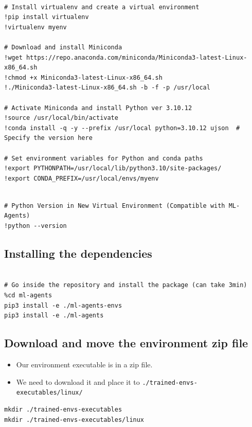 \documentclass[11pt,a4paper]{article}
\begin{document}
\begin{lstlisting}

# Install virtualenv and create a virtual environment
!pip install virtualenv
!virtualenv myenv

# Download and install Miniconda
!wget https://repo.anaconda.com/miniconda/Miniconda3-latest-Linux-x86_64.sh
!chmod +x Miniconda3-latest-Linux-x86_64.sh
!./Miniconda3-latest-Linux-x86_64.sh -b -f -p /usr/local

# Activate Miniconda and install Python ver 3.10.12
!source /usr/local/bin/activate
!conda install -q -y --prefix /usr/local python=3.10.12 ujson  # Specify the version here

# Set environment variables for Python and conda paths
!export PYTHONPATH=/usr/local/lib/python3.10/site-packages/
!export CONDA_PREFIX=/usr/local/envs/myenv
\end{lstlisting}

\begin{lstlisting}

# Python Version in New Virtual Environment (Compatible with ML-Agents)
!python --version
\end{lstlisting}

\subsection{Installing the dependencies}\label{installing-the-dependencies}

\begin{lstlisting}

# Go inside the repository and install the package (can take 3min)
%cd ml-agents
pip3 install -e ./ml-agents-envs
pip3 install -e ./ml-agents
\end{lstlisting}

\subsection{Download and move the environment zip file}\label{download-and-move-the-environment-zip-file-in-.trained-envs-executableslinux}

\begin{itemize}
\tightlist
\item
  Our environment executable is in a zip file.
\item
  We need to download it and place it to \texttt{./trained-envs-executables/linux/}
\end{itemize}

\begin{lstlisting}
mkdir ./trained-envs-executables
mkdir ./trained-envs-executables/linux
\end{lstlisting}
\end{document}
